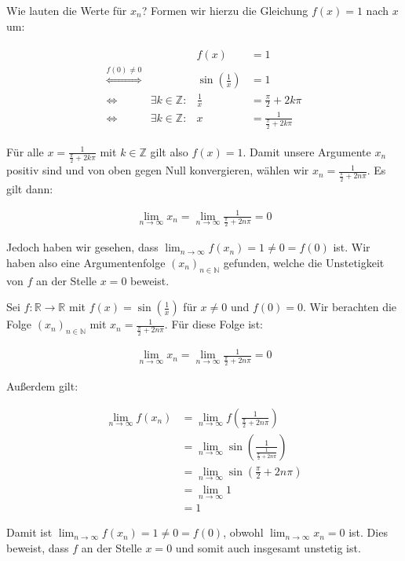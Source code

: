 \documentclass[fontsize=9pt,
               parskip=half-,
               DIV=14,
               listof=chapterentry,
               tocflat]{scrbook}
\begin{document}
\begin{solutionprocess*}
Wie lauten die Werte für $x_{n}$? Formen wir hierzu die Gleichung $f(x)=1$ nach $x$ um:

\begin{align*}
{\begin{array}{rrrl}&&f(x)&=1\\[0.5em]{\overset {f(0)\neq 0}{\iff {}}}&&\sin \left({\frac {1}{x}}\right)&=1\\[0.5em]\iff {}&\exists k\in \mathbb {Z} :&{\frac {1}{x}}&={\frac {\pi }{2}}+2k\pi \\[0.5em]\iff {}&\exists k\in \mathbb {Z} :&x&={\frac {1}{{\frac {\pi }{2}}+2k\pi }}\end{array}}
\end{align*}

Für alle $x={\tfrac {1}{{\frac {\pi }{2}}+2k\pi }}$ mit $k\in \mathbb {Z} $ gilt also $f(x)=1$. Damit unsere Argumente $x_{n}$ positiv sind und von oben gegen Null konvergieren, wählen wir $x_{n}={\tfrac {1}{{\frac {\pi }{2}}+2n\pi }}$. Es gilt dann:

\begin{align*}
\lim _{n\to \infty }x_{n}=\lim _{n\to \infty }{\frac {1}{{\frac {\pi }{2}}+2n\pi }}=0
\end{align*}

Jedoch haben wir gesehen, dass $\lim _{n\to \infty }f(x_{n})=1\neq 0=f(0)$ ist. Wir haben also eine Argumentenfolge $(x_{n})_{n\in \mathbb {N} }$ gefunden, welche die Unstetigkeit von $f$ an der Stelle $x=0$ beweist.

\end{solutionprocess*}

\begin{proof*}
Sei $f:\mathbb {R} \to \mathbb {R} $ mit $f(x)=\sin \left({\tfrac {1}{x}}\right)$ für $x\neq 0$ und $f(0)=0$. Wir berachten die Folge $(x_{n})_{n\in \mathbb {N} }$ mit $x_{n}={\tfrac {1}{{\frac {\pi }{2}}+2n\pi }}$. Für diese Folge ist:

\begin{align*}
\lim _{n\to \infty }x_{n}=\lim _{n\to \infty }{\frac {1}{{\frac {\pi }{2}}+2n\pi }}=0
\end{align*}

Außerdem gilt:

\begin{align*}
\lim _{n\to \infty }f(x_{n})&=\lim _{n\to \infty }f\left({\frac {1}{{\frac {\pi }{2}}+2n\pi }}\right)\\[0.5em]&=\lim _{n\to \infty }\sin \left({\frac {1}{\frac {1}{{\frac {\pi }{2}}+2n\pi }}}\right)\\[0.5em]&=\lim _{n\to \infty }\sin \left({\frac {\pi }{2}}+2n\pi \right)\\[0.5em]&=\lim _{n\to \infty }1\\[0.5em]&=1
\end{align*}

Damit ist $\lim _{n\to \infty }f(x_{n})=1\neq 0=f(0)$, obwohl $\lim _{n\to \infty }x_{n}=0$ ist. Dies beweist, dass $f$ an der Stelle $x=0$ und somit auch insgesamt unstetig ist.

\end{proof*}
\end{document}
